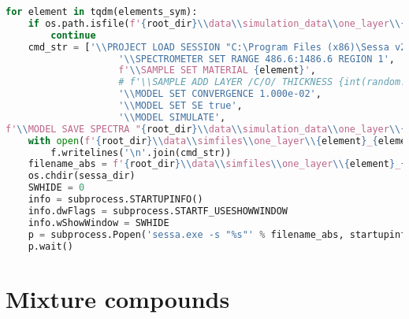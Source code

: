 \begin{lstlisting}[language=Python]
for element in tqdm(elements_sym):
    if os.path.isfile(f'{root_dir}\\data\\simulation_data\\one_layer\\{element}_{element}_spectra.spc'):
        continue
    cmd_str = ['\\PROJECT LOAD SESSION "C:\Program Files (x86)\Sessa v2.2.0\\bin/Sessa_ini.ses"',
                    '\\SPECTROMETER SET RANGE 486.6:1486.6 REGION 1',
                    f'\\SAMPLE SET MATERIAL {element}',
                    # f'\\SAMPLE ADD LAYER /C/O/ THICKNESS {int(random.triangular(12, 24, 15))} ABOVE 0',
                    '\\MODEL SET CONVERGENCE 1.000e-02',
                    '\\MODEL SET SE true',
                    '\\MODEL SIMULATE',
f'\\MODEL SAVE SPECTRA "{root_dir}\\data\\simulation_data\\one_layer\\{element}_{element}_spectra.spc"']
    with open(f'{root_dir}\\data\\simfiles\\one_layer\\{element}_{element}.txt', 'w') as f:
        f.writelines('\n'.join(cmd_str))
    filename_abs = f'{root_dir}\\data\\simfiles\\one_layer\\{element}_{element}.txt'
    os.chdir(sessa_dir)
    SWHIDE = 0
    info = subprocess.STARTUPINFO()
    info.dwFlags = subprocess.STARTF_USESHOWWINDOW
    info.wShowWindow = SWHIDE
    p = subprocess.Popen('sessa.exe -s "%s"' % filename_abs, startupinfo=info)
    p.wait()
\end{lstlisting}

\hypertarget{mixture-compounds}{%
\section{Mixture compounds}\label{mixture-compounds}}

